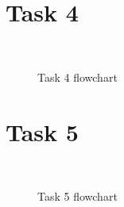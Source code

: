 \documentclass[a4paper,12pt]{article}
\begin{document}
\break

\section{Task 4}

\lstset{style=CStyle}

\begin{lstlisting}[style=CStyle]


\end{lstlisting}

\break
\begin{figure}
\begin{center}
\end{center}
\caption{Task 4 flowchart}
\label{task4}
\end{figure}

\break
\section{Task 5}

\lstset{style=CStyle}

\begin{lstlisting}[style=CStyle]


\end{lstlisting}

\break
\begin{figure}
\begin{center}
\end{center}
\caption{Task 5 flowchart}
\label{task5}
\end{figure}






\end{document}
